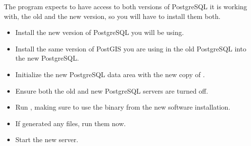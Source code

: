 \documentclass[a4paper,11pt,english]{sphinxmanual}
\begin{document}
The  program expects to have access to both versions of PostgreSQL it is working with, the old and the new version, so you will have to install them both.
\begin{itemize}
\item {} 
Install the new version of PostgreSQL you will be using.

\item {} 
Install the same version of PostGIS you are using in the old PostgreSQL into the new PostgreSQL.

\item {} 
Initialize the new PostgreSQL data area with the new copy of .

\item {} 
Ensure both the old and new PostgreSQL servers are turned off.

\item {} 
Run , making sure to use the binary from the new software installation.

\begin{sphinxVerbatim}[commandchars=\\\{\}]
   
   
   
   
\end{sphinxVerbatim}

\item {} 
If  generated any  files, run them now.

\item {} 
Start the new server.

\end{itemize}
\end{document}
